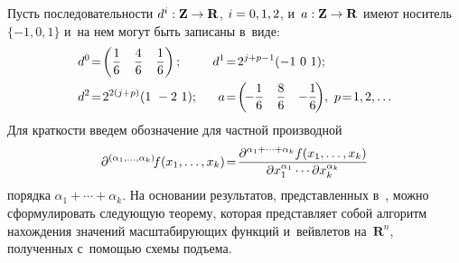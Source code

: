 \begin{multicols}{2}
  Пусть последовательности $d^i: \mathbf{Z}\hm\to \mathbf{R}$, $i\hm= 0,1,2$, 
и~$a: \mathbf{Z}\hm\to \mathbf{R}$ имеют носитель $\{-1, 0, 1\}$ и~на нем могут 
быть записаны в~виде:
\begin{alignat*}{2}
d^0&\!=\!\begin{pmatrix}
\fr{1}{6} & \fr{4}{6} & \fr{1}{6}\end{pmatrix};&\ 
d^1&\!=\! 2^{j+p-1}(-1\ 0\ 1); \\
d^2&\!=\!
2^{2(j+p)}(1\ -2\ 1);&\ 
a&\!=\! \begin{pmatrix}\!
-\fr{1}{6} & \fr{8}{6} & -\fr{1}{6}\!\end{pmatrix}\!,\ p\!=\!1,2,\ldots
\end{alignat*}
 Для краткости введем обозначение для 
част\-ной производной
  $$
  \partial^{(\alpha_1, \ldots, \alpha_k)} \! f(x_1, \ldots, x_k)\!=\! 
  \displaystyle\frac{\displaystyle \partial^{\alpha_1+\cdots+\alpha_k} f(x_1,\ldots , x_k)\mathstrut}{\displaystyle \partial 
x_1^{\alpha_1}\cdots \partial x_k^{\alpha_k}\mathstrut}
  $$
  порядка $\alpha_1+\cdots + \alpha_k$. На основании результатов, 
пред\-став\-лен\-ных в~\cite{7-bos, 9-bos}, можно сформулировать сле\-ду\-ющую 
тео\-ре\-му, которая пред\-став\-ля\-ет собой алгоритм на\-хож\-де\-ния значений 
масштабирующих функций и~вейвлетов на~$\mathbf{R}^n$, полученных 
с~по\-мощью схемы подъема.

\begin{figure*}[b] %
\vspace*{1pt}
  \begin{center}  
    \mbox{%
\epsfxsize=159.507mm
}

\end{center}
\vspace*{-9pt}
\end{figure*}

\smallskip


\end{multicols}
